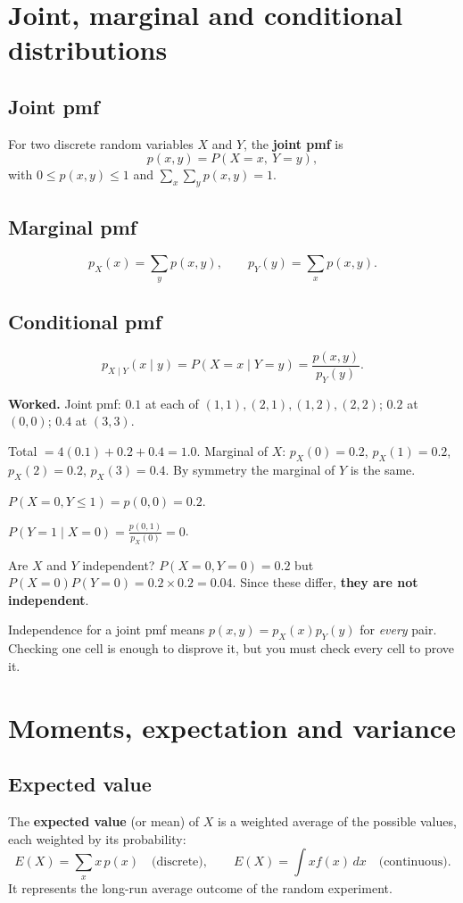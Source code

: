 \documentclass[11pt,a4paper]{article}
\begin{document}
\section{Joint, marginal and conditional distributions}

\subsection{Joint pmf}
For two discrete random variables $X$ and $Y$, the \textbf{joint pmf} is
\[
p(x,y)=P(X=x,\ Y=y),
\]
with $0\le p(x,y)\le 1$ and $\sum_x\sum_y p(x,y)=1$.

\subsection{Marginal pmf}
\[
p_X(x)=\sum_y p(x,y),\qquad p_Y(y)=\sum_x p(x,y).
\]

\subsection{Conditional pmf}
\[
p_{X\mid Y}(x\mid y)=P(X=x\mid Y=y)=\frac{p(x,y)}{p_Y(y)}.
\]

\begin{exambox}
\textbf{Worked.} Joint pmf: $0.1$ at each of $(1,1),(2,1),(1,2),(2,2)$; $0.2$ at $(0,0)$; $0.4$ at $(3,3)$.

Total $=4(0.1)+0.2+0.4=1.0$. Marginal of $X$: $p_X(0)=0.2$, $p_X(1)=0.2$, $p_X(2)=0.2$, $p_X(3)=0.4$. By symmetry the marginal of $Y$ is the same.

$P(X=0,Y\le 1)=p(0,0)=0.2$.

$P(Y=1\mid X=0)=\frac{p(0,1)}{p_X(0)}=0$.

Are $X$ and $Y$ independent? $P(X=0,Y=0)=0.2$ but $P(X=0)P(Y=0)=0.2\times0.2=0.04$. Since these differ, \textbf{they are not independent}.
\end{exambox}

\begin{dangerbox}
Independence for a joint pmf means $p(x,y)=p_X(x)p_Y(y)$ for \emph{every} pair. Checking one cell is enough to disprove it, but you must check every cell to prove it.
\end{dangerbox}

\section{Moments, expectation and variance}

\subsection{Expected value}
The \textbf{expected value} (or mean) of $X$ is a weighted average of the possible values, each weighted by its probability:
\[
E(X)=\sum_x x\,p(x) \quad\text{(discrete)},\qquad E(X)=\int x f(x)\,dx \quad\text{(continuous)}.
\]
It represents the long-run average outcome of the random experiment.
\end{document}

